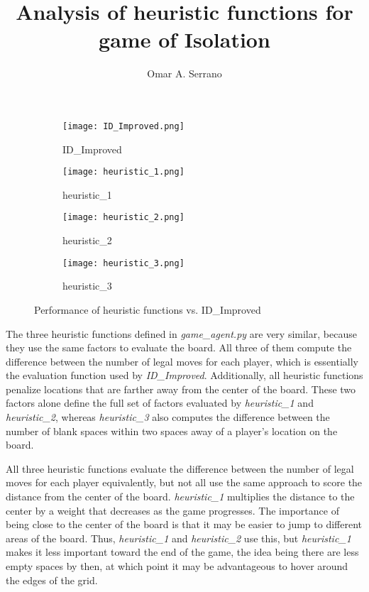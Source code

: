 \documentclass[10pt,a4paper]{article}
\title{Analysis of heuristic functions for game of Isolation}
\author{Omar A. Serrano}
\begin{document}
\maketitle

\begin{figure}
\centering
  \begin{subfigure}{.5\textwidth}
    \centering
    \texttt{[image: ID\_Improved.png]}
    \caption{ID\_Improved}
    \label{fig:sub2}
  \end{subfigure}%
  \begin{subfigure}{.5\textwidth}
    \centering
    \texttt{[image: heuristic\_1.png]}
    \caption{heuristic\_1}
    \label{fig:sub1}
  \end{subfigure}
  \begin{subfigure}{.5\textwidth}
    \centering
    \texttt{[image: heuristic\_2.png]}
    \caption{heuristic\_2}
    \label{fig:sub3}
  \end{subfigure}%
  \begin{subfigure}{.5\textwidth}
    \centering
    \texttt{[image: heuristic\_3.png]}
    \caption{heuristic\_3}
    \label{fig:sub4}
  \end{subfigure}
\label{fig:test}
\caption{Performance of heuristic functions vs. ID\_Improved}
\end{figure}

The three heuristic functions defined in \textit{game\_agent.py} are very
similar, because they use the same factors to evaluate the board. All three of
them compute the difference between the number of legal moves for each player,
which is essentially the evaluation function used by \textit{ID\_Improved}.
Additionally, all heuristic functions penalize locations that are farther away
from the center of the board. These two factors alone define the full set of
factors evaluated by \textit{heuristic\_1} and \textit{heuristic\_2}, whereas
\textit{heuristic\_3} also computes the difference between the number of
blank spaces within two spaces away of a player's location on the board.

All three heuristic functions evaluate the difference between the number of
legal moves for each player equivalently, but not all use the same approach to
score the distance from the center of the board. \textit{heuristic\_1}
multiplies the distance to the center by a weight that decreases as the game
progresses. The importance of being close to the center of the board is that
it may be easier to jump to different areas of the board. Thus,
\textit{heuristic\_1} and \textit{heuristic\_2} use this, but
\textit{heuristic\_1} makes it less important toward the end of the game, the
idea being there are less empty spaces by then, at which point it may be
advantageous to hover around the edges of the grid.
\end{document}

